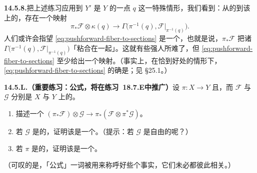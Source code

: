 \textbf{14.5.8.}\quad 把上述练习应用到 $Y'$ 是 $Y$ 的一点 $q$ 这一特殊情形，我们看到：从\trPushforward{}的\trFiber{}到该\trFiber{}上的\trSection，存在一个\trNatural{}映射
\begin{equation*}\tag{14.5.8.1}\label{eq:pushforward-fiber-to-sections}
\pi_*\mathscr{F}\otimes\kappa(q)\longrightarrow\Gamma\bigl(\pi^{-1}(q),\mathscr{F}\vert_{\pi^{-1}(q)}\bigr).
\end{equation*}
人们或许会指望 \eqref{eq:pushforward-fiber-to-sections} 是一个\trIsomorphism，也就是说，$\pi_*\mathscr{F}$ 把诸\trFiber{} $\Gamma\bigl(\pi^{-1}(q),\mathscr{F}\vert_{\pi^{-1}(q)}\bigr)$「粘合在一起」。这就有些强人所难了，但 \eqref{eq:pushforward-fiber-to-sections} 至少给出一个映射。（事实上，在恰到好处的情形下，\eqref{eq:pushforward-fiber-to-sections} 的确是\trIsomorphism；见 \S25.1。）

\textbf{14.5.L.（重要练习：\trProjection{}公式，将在\mbox{练习~18.7.E}中推广）}\quad 设 $\pi\colon X\to Y$ \trQuasicompact{}且\trQuasiSeparated，而 $\mathscr{F}$ 与 $\mathscr{G}$ 分别是 $X$ 与 $Y$ 上的\trQCSheaf。
\begin{enumerate}[label=(\alph*)]
\item 描述一个\trNatural{}\trMorphism{} $(\pi_*\mathscr{F})\otimes\mathscr{G}\to\pi_*(\mathscr{F}\otimes\pi^*\mathscr{G})$。
\item 若 $\mathscr{G}$ 是\trLocallyFree{}的，证明该\trNatural{}\trMorphism{}是一个\trIsomorphism。（提示：若 $\mathscr{G}$ 是自由的呢？）
\item 若 $\pi$ 是\trAffine{}的，证明该\trNatural{}\trMorphism{}是一个\trIsomorphism。
\end{enumerate}
（可叹的是，「\trProjection{}公式」一词被用来称呼好些个事实，它们未必都彼此相关。）

